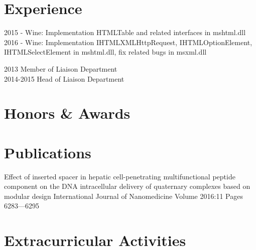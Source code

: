 

\section{Experience}

{
	{2015 - Wine: Implementation HTMLTable and related interfaces in mshtml.dll\\
	2016 - 	Wine: Implementation IHTMLXMLHttpRequest, IHTMLOptionElement, IHTMLSelectElement in mshtml.dll, fix related bugs in msxml.dll}
}



{
	2013 Member of Liaison Department\\
	2014-2015 Head of Liaison Department
}

\section{ Honors \& Awards }

\section{Publications}

\publicationgroup
{Effect of inserted spacer in hepatic cell-penetrating multifunctional peptide component on the DNA intracellular delivery of quaternary complexes based on modular design}
{ International Journal of Nanomedicine Volume 2016:11 Pages 6283—6295  }



\section{Extracurricular Activities}

